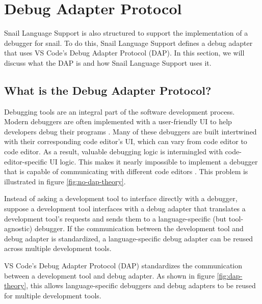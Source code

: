\documentclass{article}
\begin{document}
\section{Debug Adapter Protocol}

Snail Language Support is also structured to support the implementation of a debugger for snail. To do this, Snail Language Support defines a debug adapter that uses VS Code's Debug Adapter Protocol (DAP). In this section, we will discuss what the DAP is and how Snail Language Support uses it.

\subsection{What is the Debug Adapter Protocol?}

Debugging tools are an integral part of the software development process. Modern debuggers are often implemented with a user-friendly UI to help developers debug their programs \cite{Microsoft_2022b,Matloff_Salzman_2008,Sinha_2017}. Many of these debuggers are built intertwined with their corresponding code editor's UI, which can vary from code editor to code editor. As a result, valuable debugging logic is intermingled with code-editor-specific UI logic. This makes it nearly impossible to implement a debugger that is capable of communicating with different code editors \cite{Microsoft_2021a}. This problem is illustrated in figure \ref{fig:no-dap-theory}.

Instead of asking a development tool to interface directly with a debugger, suppose a development tool interfaces with a debug adapter that translates a development tool's requests and sends them to a language-specific (but tool-agnostic) debugger. If the communication between the development tool and debug adapter is standardized, a language-specific debug adapter can be reused across multiple development tools. 

VS Code's Debug Adapter Protocol (DAP) standardizes the communication between a development tool and debug adapter. As shown in figure \ref{fig:dap-theory}, this allows language-specific debuggers and debug adapters to be reused for multiple development tools.
\end{document}
